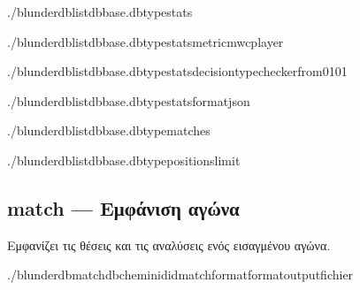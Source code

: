 \documentclass[letterpaper,10pt,greek]{sphinxmanual}
\begin{document}
\begin{sphinxVerbatim}[commandchars=\\\{\}]
./blunderdblist\PYGZhy{}\PYGZhy{}dbbase.db\PYGZhy{}\PYGZhy{}typestats

./blunderdblist\PYGZhy{}\PYGZhy{}dbbase.db\PYGZhy{}\PYGZhy{}typestats\PYGZhy{}\PYGZhy{}metricmwc\PYGZhy{}\PYGZhy{}player

./blunderdblist\PYGZhy{}\PYGZhy{}dbbase.db\PYGZhy{}\PYGZhy{}typestats\PYGZhy{}\PYGZhy{}decision\PYGZhy{}typechecker\PYGZhy{}\PYGZhy{}from\PYGZhy{}01\PYGZhy{}01

./blunderdblist\PYGZhy{}\PYGZhy{}dbbase.db\PYGZhy{}\PYGZhy{}typestats\PYGZhy{}\PYGZhy{}formatjson

./blunderdblist\PYGZhy{}\PYGZhy{}dbbase.db\PYGZhy{}\PYGZhy{}typematches

./blunderdblist\PYGZhy{}\PYGZhy{}dbbase.db\PYGZhy{}\PYGZhy{}typepositions\PYGZhy{}\PYGZhy{}limit
\end{sphinxVerbatim}


\subsection{match — Εμφάνιση αγώνα}
\label{\detokenize{cli:match-afficher-un-match}}
\sphinxAtStartPar
Εμφανίζει τις θέσεις και τις αναλύσεις ενός εισαγμένου αγώνα.

\begin{sphinxVerbatim}[commandchars=\\\{\}]
./blunderdbmatch\PYGZhy{}\PYGZhy{}db\PYGZlt{}chemin\PYGZgt{}\PYGZhy{}\PYGZhy{}id\PYGZlt{}id\PYGZus{}match\PYGZgt{}\PYG{o}{[}\PYGZhy{}\PYGZhy{}format\PYGZlt{}format\PYGZgt{}\PYG{o}{]}\PYG{o}{[}\PYGZhy{}\PYGZhy{}output\PYGZlt{}fichier\PYGZgt{}\PYG{o}{]}
\end{sphinxVerbatim}
\end{document}
